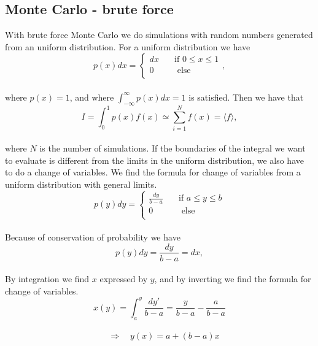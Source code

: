 \documentclass[12pt]{article}
\begin{document}
\begin{flushleft}
\subsection{Monte Carlo - brute force}
\vspace{5mm}
With brute force Monte Carlo we do simulations with random numbers generated from an uniform distribution. For a uniform distribution we have 
\vspace{5mm}
$$p(x)dx = 
\begin{cases}
    dx       & \quad \text{if } 0\leq x\leq 1\\
    0  & \quad \text{ else}\\
  \end{cases},$$\\
\vspace{5mm}
\newpage
where $p(x) = 1$, and where $\int_{-\infty}^\infty p(x)dx = 1$ is satisfied. Then we have that\\
\vspace{5mm}
$$I = \int_0^1 p(x)f(x)  \simeq \sum\limits_{i=1}^N f(x) = \langle f\rangle,$$\\
\vspace{5mm}
where $N$ is the number of simulations. If the boundaries of the integral we want to evaluate is different from the limits in the uniform distribution, we also have to do a change of variables. We find the formula for change of variables from a uniform distribution with general limits.
\vspace{5mm}
$$p(y)dy = 
\begin{cases}
    \frac{dy}{b-a}       & \quad \text{if } a\leq y\leq b\\
    0  & \quad \text{ else}\\
  \end{cases}$$\\
\vspace{5mm} 
Because of conservation of probability we have
\vspace{5mm}
$$p(y)dy = \frac{dy}{b-a} = dx,$$\\
\vspace{5mm}
By integration we find $x$ expressed by $y$, and by inverting we find the formula for change of variables.
\vspace{5mm}
$$x(y) = \int_a^y \frac{dy'}{b-a} = \frac{y}{b-a} - \frac{a}{b-a}$$\\
\vspace{5mm}
$$\quad\Rightarrow\quad y(x) = a + (b-a)x$$\\
\vspace{5mm}

\end{flushleft}
\end{document}
